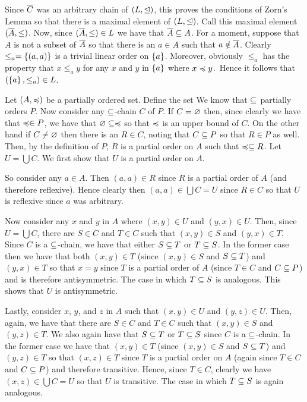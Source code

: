 {{      Since $\Cb$ was an arbitrary chain of $(L, \tleq)$, this proves the conditions of Zorn's Lemma so that there is a maximal element of $(L, \tleq)$.
      Call this maximal element $(\Ab, \leq)$.
      Now, since $(\Ab, \leq) \in L$ we have that $\Ab \ss A$.
      For a moment, suppose that $A$ is not a subset of $\Ab$ so that there is an $a \in A$ such that $a \notin \Ab$.
      Clearly $\leq_a = \braces{(a,a)}$ is a trivial linear order on $\braces{a}$.
      Moreover, obviously $\leq_a$ has the property that $x \leq_a y$ for any $x$ and $y$ in $\braces{a}$ where $x \prece y$.\
      Hence it follows that $(\braces{a}, \leq_a) \in L$.
    \fi

    Let $(A, \prece)$ be a partially ordered set.
    Define the set
    \gath{
      P = \braces{R \ss A \times A \where \text{$R$ is a partial order of $A$ and $\prece \ss R$}}.
    }
    We know that $\ss$ partially orders $P$.
    Now consider any $\ss$-chain $C$ of $P$.
    If $C = \es$ then, since clearly we have that $\prece \in P$, we have that $\es \ss \prece$ so that $\prece$ is an upper bound of $C$.
    On the other hand if $C \neq \es$ then there is an $R \in C$, noting that $C \ss P$ so that $R \in P$ as well.
    Then, by the definition of $P$, $R$ is a partial order on $A$ such that $\prece \ss R$.
    Let $U = \bigcup C$. We first show that $U$ is a partial order on $A$.

    So consider any $a \in A$.
    Then $(a,a) \in R$ since $R$ is a partial order of $A$ (and therefore reflexive).
    Hence clearly then $(a,a) \in \bigcup C = U$ since $R \in C$ so that $U$ is reflexive since $a$ was arbitrary.

    Now consider any $x$ and $y$ in $A$ where $(x,y) \in U$ and $(y,x) \in U$.
    Then, since $U = \bigcup C$, there are $S \in C$ and $T \in C$ such that $(x,y) \in S$ and $(y,x) \in T$.
    Since $C$ is a $\ss$-chain, we have that either $S \ss T$ or $T \ss S$.
    In the former case then we have that both $(x,y) \in T$ (since $(x,y) \in S$ and $S \ss T$) and $(y,x) \in T$ so that $x=y$ since $T$ is a partial order of $A$ (since $T \in C$ and $C \ss P$) and is therefore antisymmetric.
    The case in which $T \ss S$ is analogous.
    This shows that $U$ is antisymmetric.

    Lastly, consider $x$, $y$, and $z$ in $A$ such that $(x,y) \in U$ and $(y,z) \in U$.
    Then, again, we have that there are $S \in C$ and $T \in C$ such that $(x,y) \in S$ and $(y,z) \in T$.
    We also again have that $S \ss T$ or $T \ss S$ since $C$ is a $\ss$-chain.
    In the former case we have that $(x,y) \in T$ (since $(x,y) \in S$ and $S \ss T$) and $(y,z) \in T$ so that $(x,z) \in T$ since $T$ is a partial order on $A$ (again since $T \in C$ and $C \ss P$) and therefore transitive.
    Hence, since $T \in C$, clearly we have $(x,z) \in \bigcup C = U$ so that $U$ is transitive.
    The case in which $T \ss S$ is again analogous.

}}
